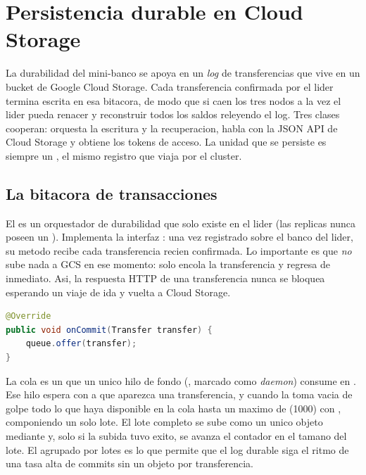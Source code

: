 \section{Persistencia durable en Cloud Storage}

La durabilidad del mini-banco se apoya en un \emph{log} de transferencias que
vive en un bucket de Google Cloud Storage. Cada transferencia confirmada por el
lider termina escrita en esa bitacora, de modo que si caen los tres nodos a la
vez el lider pueda renacer y reconstruir todos los saldos releyendo el log. Tres
clases cooperan:  orquesta la escritura y la
recuperacion,  habla con la JSON API de Cloud
Storage y  obtiene los tokens de acceso. La unidad
que se persiste es siempre un , el mismo registro que
viaja por el cluster.

\subsection{La bitacora de transacciones}

El  es un orquestador de durabilidad que solo existe
en el lider (las replicas nunca poseen un ). Implementa la
interfaz : una vez registrado sobre el banco del
lider, su metodo  recibe cada transferencia recien
confirmada. Lo importante es que \emph{no} sube nada a GCS en ese momento: solo
encola la transferencia y regresa de inmediato. Asi, la respuesta HTTP de una
transferencia nunca se bloquea esperando un viaje de ida y vuelta a Cloud
Storage.

\begin{lstlisting}[language=Java,caption={onCommit solo encola; la subida ocurre fuera del hot path}]
@Override
public void onCommit(Transfer transfer) {
    queue.offer(transfer);
}
\end{lstlisting}

La cola es un  que un unico hilo de fondo
(, marcado como \emph{daemon}) consume en
. Ese hilo espera con  a que
aparezca una transferencia, y cuando la toma vacia de golpe todo lo que haya
disponible en la cola hasta un maximo de  (1000) con
, componiendo un solo lote. El lote completo se sube como un
unico objeto mediante  y, solo si la subida tuvo
exito, se avanza el contador  en el tamano del lote. El agrupado
por lotes es lo que permite que el log durable siga el ritmo de una tasa alta de
commits sin un objeto por transferencia.

